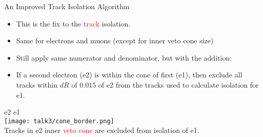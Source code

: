 \documentclass{beamer}
\begin{document}
\begin{frame}{An Improved Track Isolation Algorithm}%
  \begin{itemize}
    \item This is the fix to the \textcolor{red}{track} isolation.
    \item Same for electrons and muons (except for inner veto cone size)
    \item Still apply same numerator and denominator, but with the addition:
    \item If a second electron (e2) is within the cone of first (e1), then exclude all tracks within $dR$ of $0.015$ of e2 from the tracks used to calculate isolation for e1.
  \end{itemize}

  \begin{center}
    \scriptsize{e2} \hspace{1.75cm} \scriptsize{e1}\\
    \vspace{-0.025cm} %
    \texttt{[image: talk3/cone\_border.png]} \\
    Tracks in e2 inner \textcolor{red}{veto cone} are excluded from isolation of e1.
  \end{center}

\end{frame}
\end{document}
